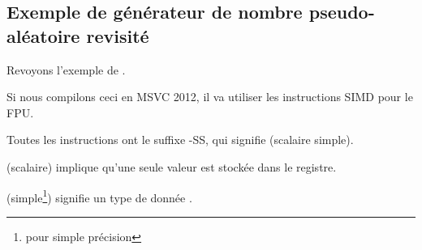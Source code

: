 \subsection{Exemple de générateur de nombre pseudo-aléatoire revisité}
\label{FPU_PRNG_SIMD}

Revoyons l'exemple de  .

Si nous compilons ceci en MSVC 2012, il va utiliser les instructions SIMD pour le
FPU.




Toutes les instructions ont le suffixe -SS, qui signifie  (scalaire simple).

 (scalaire) implique qu'une seule valeur est stockée dans le registre.

 (simple\footnote{pour simple précision}) signifie un type de donnée \Tfloat.


